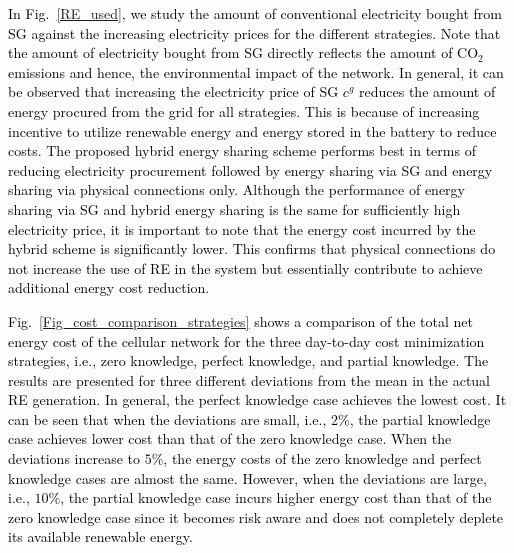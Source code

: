 \documentclass[10pt, letter,twocolumn]{IEEEtran}
\begin{document}
\textcolor{black}{In Fig.~\ref{RE_used}, we study the amount of conventional electricity bought from SG against the increasing electricity prices for the different strategies. Note that the amount of electricity bought from SG directly reflects the amount of CO$_2$ emissions and hence, the environmental impact of the network. In general, it can be observed that increasing the electricity price of SG $c^g$ reduces the amount of energy procured from the grid for all strategies. This is because of increasing incentive to utilize renewable energy and energy stored in the battery to reduce costs. The proposed hybrid energy sharing scheme performs best in terms of reducing electricity procurement followed by energy sharing via SG and energy sharing via physical connections only. Although the performance of energy sharing via SG and hybrid energy sharing is the same for sufficiently high electricity price, it is important to note that the energy cost incurred by the hybrid scheme is significantly lower. This confirms that physical connections do not increase the use of RE in the system but essentially contribute to achieve additional energy cost reduction.}

\textcolor{black}{Fig.~\ref{Fig_cost_comparison_strategies} shows a comparison of the total net energy cost of the cellular network for the three day-to-day cost minimization strategies, i.e., zero knowledge, perfect knowledge, and partial knowledge. The results are presented for three different deviations from the mean in the actual RE generation. In general, the perfect knowledge case achieves the lowest cost. It can be seen that when the deviations are small, i.e., $2\%$, the partial knowledge case achieves lower cost than that of the zero knowledge case. When the deviations increase to $5\%$, the energy costs of the zero knowledge and perfect knowledge cases are almost the same. However, when the deviations are large, i.e., $10\%$, the partial knowledge case incurs higher energy cost than that of the zero knowledge case since it becomes risk aware and does not completely deplete its available renewable energy.}

\vspace{-0.0cm}
\end{document}
